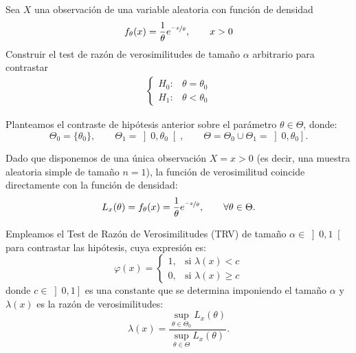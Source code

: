 \begin{ejercicio}
    Sea $X$ una observación de una variable aleatoria con función de densidad
    \begin{equation*}
        f_\theta(x) = \frac{1}{\theta} e^{\nicefrac{-x}{\theta}}, \qquad x>0
    \end{equation*}
    Construir el test de razón de verosimilitudes de tamaño $\alpha$ arbitrario para contrastar
    \begin{align*}
        \begin{cases}
            H_0: & \theta = \theta_0 \\
            H_1: & \theta < \theta_0
        \end{cases}
    \end{align*}

    Planteamos el contraste de hipótesis anterior sobre el parámetro $\theta \in \Theta$, donde:
    \begin{equation*}
        \Theta_0 = \{\theta_0\}, \qquad \Theta_1 = \left]0, \theta_0\right[, \qquad \Theta = \Theta_0 \cup \Theta_1 = \left]0, \theta_0\right].
    \end{equation*}

    Dado que disponemos de una única observación $X = x > 0$ (es decir, una muestra aleatoria simple de tamaño $n = 1$), la función de verosimilitud coincide directamente con la función de densidad:
    \begin{equation*}
        L_x(\theta) = f_\theta(x) = \frac{1}{\theta} e^{\nicefrac{-x}{\theta}}, \qquad \forall \theta \in \Theta.
    \end{equation*}

    Empleamos el Test de Razón de Verosimilitudes (TRV) de tamaño $\alpha \in \left]0, 1\right[$ para contrastar las hipótesis, cuya expresión es:
    \begin{equation*}
        \varphi(x) =
        \begin{cases}
            1, & \text{si } \lambda(x) < c \\
            0, & \text{si } \lambda(x) \geq c
        \end{cases}
    \end{equation*}
    donde $c \in \left]0, 1\right]$ es una constante que se determina imponiendo el tamaño $\alpha$ y $\lambda(x)$ es la razón de verosimilitudes:
    \begin{equation*}
        \lambda(x) = \frac{\sup\limits_{\theta \in \Theta_0} L_x(\theta)}{\sup\limits_{\theta \in \Theta} L_x(\theta)}.
    \end{equation*}


\end{ejercicio}
